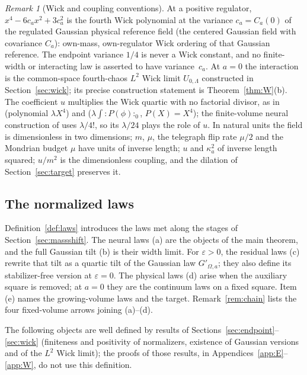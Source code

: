 \documentclass[11pt]{article}
\theoremstyle{plain}
\theoremstyle{definition}
\theoremstyle{remark}
\newtheorem{remark}[theorem]{Remark}
\begin{document}
\begin{remark}[Wick and coupling conventions]\label{rem:wick}
At a positive regulator, $x^{4}-6c_ax^{2}+3c_a^{2}$ is the fourth Wick polynomial
at the variance $c_a=C_a(0)$ of the regulated Gaussian physical reference field
(the centered Gaussian field with covariance $C_a$): own-mass, own-regulator Wick
ordering of that Gaussian reference. The endpoint variance $1/4$ is never a Wick
constant, and no finite-width or interacting law is asserted to have
variance~$c_a$. At $a=0$ the interaction is the common-space fourth-chaos $L^{2}$ Wick
limit $U_{0,\Lambda}$ constructed in Section~\ref{sec:wick}; its precise
construction statement is Theorem~\ref{thm:W}(b). The coefficient $u$
multiplies the Wick quartic with no factorial divisor, as in \cite{FS1977}
(polynomial $\lambda X^{4}$) and \cite{AHKZ1989} ($\lambda\int{:}P(\phi){:}_0$,
$P(X)=X^{4}$); the finite-volume neural construction of \cite{Frank2026v2} uses
$\lambda/4!$, so its $\lambda/24$ plays the role of $u$. In natural units the
field is dimensionless in two dimensions; $m$, $\mu$, the telegraph flip rate
$\mu/2$ and the Mondrian budget $\mu$ have units of inverse length; $u$ and
$\kappa_a^{2}$ of inverse length squared; $u/m^{2}$ is the dimensionless
coupling, and the dilation of Section~\ref{sec:target} preserves it.
\end{remark}

\subsection{The normalized laws}\label{sec:laws}

Definition~\ref{def:laws} introduces the laws met along the stages of Section~\ref{sec:massshift}. The neural laws (a) are the objects of the main theorem, and the full Gaussian tilt (b) is their width limit. For $\varepsilon>0$, the residual laws (c) rewrite that tilt as a quartic tilt of the Gaussian law $G'_{\Omega,a}$; they also define its stabilizer-free version at $\varepsilon=0$. The physical laws (d) arise when the auxiliary square is removed; at $a=0$ they are the continuum laws on a fixed square. Item (e) names the growing-volume laws and the target. Remark~\ref{rem:chain} lists the four fixed-volume arrows joining (a)--(d).

The following objects are well defined by results of
Sections~\ref{sec:endpoint}--\ref{sec:wick} (finiteness and positivity of
normalizers, existence of Gaussian versions and of the $L^{2}$ Wick limit); the
proofs of those results, in Appendices~\ref{app:E}--\ref{app:W}, do not use
this definition.
\end{document}
